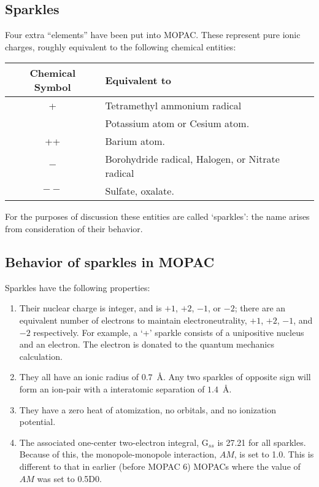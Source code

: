 \subsection{Sparkles}\label{sparkles}
Four extra ``elements'' have been put into  MOPAC.   These  represent pure 
ionic  charges,  roughly  equivalent  to  the  following  chemical entities:

\index{++}\index{$-$}\index{$--$}
\begin{center}
\begin{tabular}{cl}
    Chemical Symbol &        Equivalent to  \\
\hline
+    & Tetramethyl ammonium radical \\
     &  Potassium atom or Cesium atom.  \\ 
++   & Barium atom.  \\
$-$  & Borohydride radical, Halogen, or  Nitrate radical  \\
$-\! -$ & Sulfate, oxalate.
\end{tabular} 
\end{center}

For  the  purposes  of  discussion  these   entities   are   called
`sparkles':  the name arises from consideration of their behavior.

\subsection*{Behavior of sparkles in MOPAC}
Sparkles have the following properties:
\begin{enumerate}
\item Their nuclear charge is integer, and is $+1$, $+2$, $-1$,  or  $-2$;
there  are  an  equivalent  number  of  electrons  to  maintain
electroneutrality, $+1$, $+2$, $-1$, and $-2$ respectively.  For example, a 
`+'  sparkle  consists  of  a  unipositive  nucleus  and  an electron.  The
electron is donated  to  the  quantum  mechanics calculation.

\item  They all have an  ionic  radius  of  $0.7$~\AA.   Any  two sparkles  of 
opposite  sign  will  form  an  ion-pair  with  a interatomic separation of
$1.4$~\AA.

\item They have a zero heat  of  atomization,  no  orbitals,  and  no
ionization potential.

\item The associated one-center two-electron integral, G$_{ss}$ is 27.21 for
all sparkles.  Because of this, the monopole-monopole interaction, $AM$, is set
to 1.0.  This is different to that in earlier (before MOPAC 6) MOPACs where
the  value of $AM$ was set to 0.5D0.
\end{enumerate}

